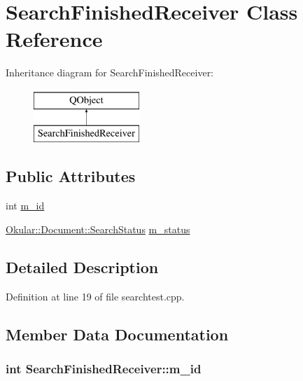 \hypertarget{classSearchFinishedReceiver}{\section{Search\+Finished\+Receiver Class Reference}
\label{classSearchFinishedReceiver}
}
Inheritance diagram for Search\+Finished\+Receiver\+:\begin{figure}[H]
\begin{center}
\leavevmode
\includegraphics[height=2.000000cm]{classSearchFinishedReceiver}
\end{center}
\end{figure}
\subsection*{Public Attributes}
\begin{DoxyCompactItemize}
\item 
int \hyperlink{classSearchFinishedReceiver_a05ff1ca722b542f0580a86a91fab0065}{m\+\_\+id}
\item 
\hyperlink{classOkular_1_1Document_aa9c2934f6abce7b0440ec74bb56eefbb}{Okular\+::\+Document\+::\+Search\+Status} \hyperlink{classSearchFinishedReceiver_a5a75af4e271846a79fc5a79c8452ed75}{m\+\_\+status}
\end{DoxyCompactItemize}


\subsection{Detailed Description}


Definition at line 19 of file searchtest.\+cpp.



\subsection{Member Data Documentation}
\hypertarget{classSearchFinishedReceiver_a05ff1ca722b542f0580a86a91fab0065}{
\subsubsection[{m\+\_\+id}]{\setlength{\rightskip}{0pt plus 5cm}int Search\+Finished\+Receiver\+::m\+\_\+id}}\label{classSearchFinishedReceiver_a05ff1ca722b542f0580a86a91fab0065}


